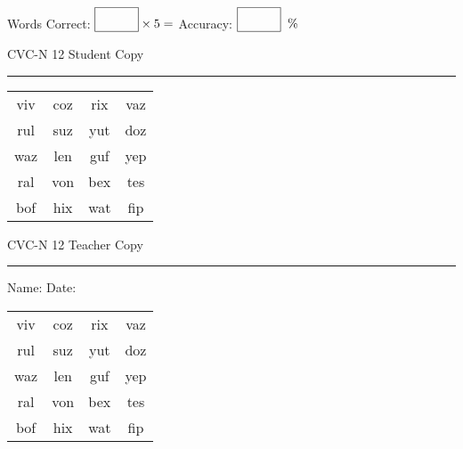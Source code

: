 \documentclass{memoir}
\begin{document}
\small

Words Correct: $\fbox{\phantom{\huge 100}} \times 5 = $ Accuracy: $\fbox{\phantom{\huge 100}}\;\; \%$ 

\vfill

\newpage


\footnotesize \noindent
CVC-N 12 \hfill Student Copy
\smallskip
\hrule

\Large

\setlength{\tabcolsep}{14pt}
\def\arraystretch{2}

{\selectfont


\begin{vplace}[0.5]
\begin{center}
\begin{tabular}{cccc}
viv & coz & rix & vaz \\
rul & suz & yut & doz \\
waz & len & guf & yep \\
ral & von & bex & tes \\
bof & hix & wat & fip \\
\end{tabular}
\end{center}
\end{vplace}

}

\newpage

\footnotesize \noindent
CVC-N 12 \hfill Teacher Copy
\smallskip
\hrule

\small

\vfill

\noindent
Name: \underline{\hspace{1.75in}} \hfill Date: \underline{\hspace{1in}}

\Large

{\selectfont


\begin{vplace}[0.5]
\begin{center}
\begin{tabular}{cccc}
viv & coz & rix & vaz \\
rul & suz & yut & doz \\
waz & len & guf & yep \\
ral & von & bex & tes \\
bof & hix & wat & fip \\
\end{tabular}
\end{center}
\end{vplace}



}
\end{document}
